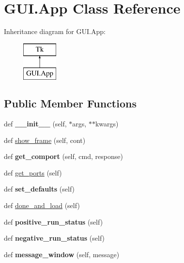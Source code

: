 \hypertarget{class_g_u_i_1_1_app}{}\section{G\+U\+I.\+App Class Reference}
\label{class_g_u_i_1_1_app}
Inheritance diagram for G\+U\+I.\+App\+:\begin{figure}[H]
\begin{center}
\leavevmode
\includegraphics[height=2.000000cm]{class_g_u_i_1_1_app}
\end{center}
\end{figure}
\subsection*{Public Member Functions}
\begin{DoxyCompactItemize}
\item 
\mbox{\label{class_g_u_i_1_1_app_a70ee92bd005059ecc9765240ef6e8f5b}} 
def {\bfseries \+\_\+\+\_\+init\+\_\+\+\_\+} (self, $\ast$args, $\ast$$\ast$kwargs)
\item 
def \mbox{\hyperlink{class_g_u_i_1_1_app_a6168406499bb44b93e6a7c63a65b2a39}{show\+\_\+frame}} (self, cont)
\item 
\mbox{\label{class_g_u_i_1_1_app_af66528172d6a667ee5f2fba341a58bab}} 
def {\bfseries get\+\_\+comport} (self, cmd, response)
\item 
def \mbox{\hyperlink{class_g_u_i_1_1_app_a87d24261fd2549666a3a2a35bbc593f1}{get\+\_\+ports}} (self)
\item 
\mbox{\label{class_g_u_i_1_1_app_a8f5a8990504bafa4100ca2e84ca921eb}} 
def {\bfseries set\+\_\+defaults} (self)
\item 
def \mbox{\hyperlink{class_g_u_i_1_1_app_aa208ca0794eea3fb8375a4ec249ee41e}{done\+\_\+and\+\_\+load}} (self)
\item 
\mbox{\label{class_g_u_i_1_1_app_a50ee4df32de54f61e2eac0c1a4e52590}} 
def {\bfseries positive\+\_\+run\+\_\+status} (self)
\item 
\mbox{\label{class_g_u_i_1_1_app_a9547dcee8b0b3ece61097567d64dd091}} 
def {\bfseries negative\+\_\+run\+\_\+status} (self)
\item 
\mbox{\label{class_g_u_i_1_1_app_a7e1fdfe0c29ab317d09afccdc5c89004}} 
def {\bfseries message\+\_\+window} (self, message)
\end{DoxyCompactItemize}
